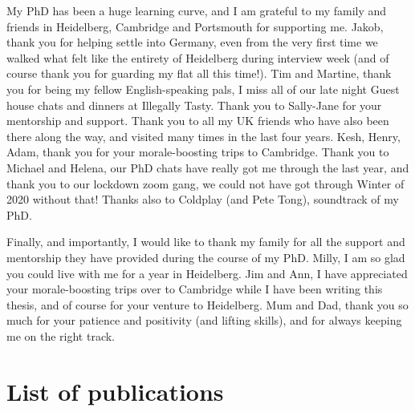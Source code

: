 \documentclass[11pt, a4paper, twosided]{book}
\begin{document}
My PhD has been a huge learning curve, and I am grateful to my family and friends in Heidelberg, Cambridge and Portsmouth for supporting me. Jakob, thank you for helping settle into Germany, even from the very first time we walked what felt like the entirety of Heidelberg during interview week (and of course thank you for guarding my flat all this time!). Tim and Martine, thank you for being my fellow English-speaking pals, I miss all of our late night Guest house chats and dinners at Illegally Tasty. Thank you to Sally-Jane for your mentorship and support. Thank you to all my UK friends who have also been there along the way, and visited many times in the last four years. Kesh, Henry, Adam, thank you for your morale-boosting trips to Cambridge. Thank you to Michael and Helena, our PhD chats have really got me through the last year, and thank you to our lockdown zoom gang, we could not have got through Winter of 2020 without that! Thanks also to Coldplay (and Pete Tong), soundtrack of my PhD.

Finally, and importantly, I would like to thank my family for all the support and mentorship they have provided during the course of my PhD. Milly, I am so glad you could live with me for a year in Heidelberg. Jim and Ann, I have appreciated your morale-boosting trips over to Cambridge while I have been writing this thesis, and of course for your venture to Heidelberg. Mum and Dad, thank you so much for your patience and positivity (and lifting skills), and for always keeping me on the right track.
\newpage\null\newpage


    \hypertarget{list-of-publications}{%
    \chapter*{List of publications}\label{list-of-publications}}
\end{document}
